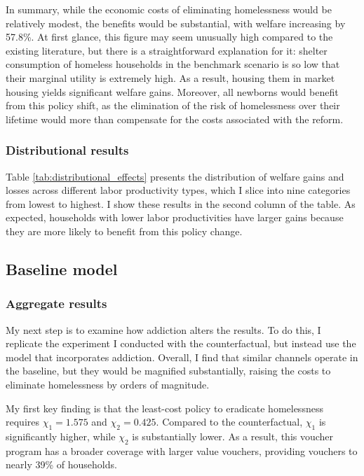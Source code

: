 \documentclass[parskip=full]{article}
\begin{document}
In summary, while the economic costs of eliminating homelessness would be relatively modest, the benefits would be substantial, with welfare increasing by 57.8\%. At first glance, this figure may seem unusually high compared to the existing literature, but there is a straightforward explanation for it: shelter consumption of homeless households in the benchmark scenario is so low that their marginal utility is extremely high. As a result, housing them in market housing yields significant welfare gains. Moreover, all newborns would benefit from this policy shift, as the elimination of the risk of homelessness over their lifetime would more than compensate for the costs associated with the reform.

\subsubsection{Distributional results}

Table \ref{tab:distributional_effects} presents the distribution of welfare gains and losses across different labor productivity types, which I slice into nine categories from lowest to highest. I show these results in the second column of the table. As expected, households with lower labor productivities have larger gains because they are more likely to benefit from this policy change.

\subsection{Baseline model}

\subsubsection{Aggregate results}

My next step is to examine how addiction alters the results. To do this, I replicate the experiment I conducted with the counterfactual, but instead use the model that incorporates addiction. Overall, I find that similar channels operate in the baseline, but they would be magnified substantially, raising the costs to eliminate homelessness by orders of magnitude.

My first key finding is that the least-cost policy to eradicate homelessness requires $\chi_{1} = 1.575$ and $\chi_{2} = 0.425$. Compared to the counterfactual, $\chi_{1}$ is significantly higher, while $\chi_{2}$ is substantially lower. As a result, this voucher program has a broader coverage with larger value vouchers, providing vouchers to nearly 39\% of households. 
\end{document}
